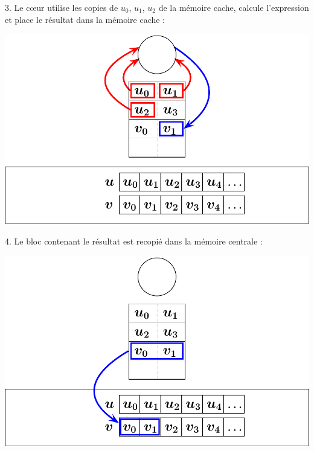 \documentclass{beamer}
\begin{document}
\begin{frame}
	\parbox[t][1cm]{10cm}{3. Le c\oe ur utilise les copies de $u_0$, $u_1$, $u_2$ de la mémoire cache, calcule l'expression et place le résultat dans la mémoire cache :}
	\begin{center}
		\includegraphics[scale=0.6]{../../Images/sequentiel2}
	\end{center}
\end{frame}
\begin{frame}
	\parbox[t][1cm]{10cm}{4. Le bloc contenant le résultat est recopié dans la mémoire centrale :}
	\begin{center}
		\includegraphics[scale=0.6]{../../Images/sequentiel3}
	\end{center}
\end{frame}
\end{document}
